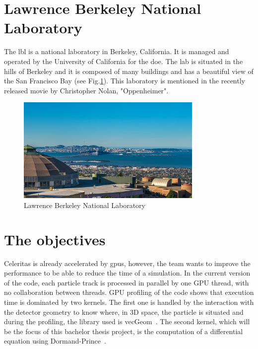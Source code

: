 \section{Lawrence Berkeley National Laboratory}
\label{ch:introduction:lbl}

The \acrfull{lbl} is a national laboratory in Berkeley, California.
It is managed and operated by the University of California for the \acrfull{doe}.
The lab is situated in the hills of Berkeley and it is composed of many buildings
and has a beautiful view of the San Francisco Bay (see Fig.\ref{fig:introduction:lbl:view}).
This laboratory is mentioned in the recently released movie by Christopher Nolan,
"Oppenheimer".

\begin{figure}[ht]
    \centering
    \includegraphics[width=0.8\textwidth]{05-resources/img/spec/lab-view.jpg}
    \caption{Lawrence Berkeley National Laboratory}
    \label{fig:introduction:lbl:view}
\end{figure}


\section{The objectives}
\label{ch:introduction:objectives}

Celeritas is already accelerated by \acrshort{gpu}s, however, the team wants to
improve the performance to be able to reduce the time of a simulation.
In the current version of the code, each particle track is processed in parallel
by one GPU thread, with no collaboration between threads.
GPU profiling of the code shows that execution time is dominated by two kernels.
The first one is handled by the interaction with the detector geometry to know
where, in 3D space, the particle is situated and during the profiling, the
library used is vecGeom~\cite{VecGeom}.
The second kernel, which will be the focus of this bachelor thesis project, is
the computation of a differential equation using Dormand-Prince~\cite{princeDormand}.

